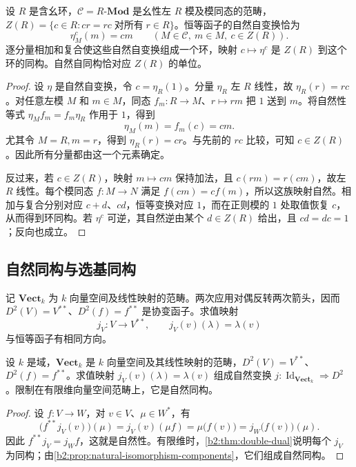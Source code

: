 \begin{proposition}\label{b2:prop:natural-center}
	设 \(R\) 是含幺环，\(\mathcal C=R\text{-}\mathbf{Mod}\) 是幺性左 \(R\) 模及模同态的范畴，\(Z(R)=\{c\in R:cr=rc\;\text{对所有}\;r\in R\}\)。恒等函子的自然自变换恰为
	\[
		\eta^c_M(m)=cm\qquad(M\in\mathcal C,\ m\in M,\ c\in Z(R)).
	\]
	逐分量相加和复合使这些自然自变换组成一个环，映射 \(c\mapsto\eta^c\) 是 \(Z(R)\) 到这个环的同构。自然自同构恰对应 \(Z(R)\) 的单位。
\end{proposition}
\begin{proof}
	设 \(\eta\) 是自然自变换，令 \(c=\eta_R(1)\)。分量 \(\eta_R\) 左 \(R\) 线性，故 \(\eta_R(r)=rc\)。对任意左模 \(M\) 和 \(m\in M\)，同态 \(f_m:R\to M\)、\(r\mapsto rm\) 把 \(1\) 送到 \(m\)。将自然性等式 \(\eta_M f_m=f_m\eta_R\) 作用于 \(1\)，得到
	\[
		\eta_M(m)=f_m(c)=cm.
	\]
	尤其令 \(M=R,m=r\)，得到 \(\eta_R(r)=cr\)。与先前的 \(rc\) 比较，可知 \(c\in Z(R)\)。因此所有分量都由这一个元素确定。

	反过来，若 \(c\in Z(R)\)，映射 \(m\mapsto cm\) 保持加法，且 \(c(rm)=r(cm)\)，故左 \(R\) 线性。每个模同态 \(f:M\to N\) 满足 \(f(cm)=cf(m)\)，所以这族映射自然。相加与复合分别对应 \(c+d\)、\(cd\)，恒等变换对应 \(1\)，而在正则模的 \(1\) 处取值恢复 \(c\)，从而得到环同构。若 \(\eta^c\) 可逆，其自然逆由某个 \(d\in Z(R)\) 给出，且 \(cd=dc=1\)；反向也成立。
\end{proof}

\subsection{自然同构与选基同构}
\label{b2:subsec:0502:02}

记 \(\mathbf{Vect}_k\) 为 \(k\) 向量空间及线性映射的范畴。两次应用对偶反转两次箭头，因而 \(D^2(V)=V^{**}\)、\(D^2(f)=f^{**}\) 是协变函子。求值映射
\[
	j_V:V\longrightarrow V^{**},\qquad j_V(v)(\lambda)=\lambda(v)
\]
与恒等函子有相同方向。

\begin{proposition}\label{b2:prop:natural-double-dual}
	设 \(k\) 是域，\(\mathbf{Vect}_k\) 是 \(k\) 向量空间及其线性映射的范畴，\(D^2(V)=V^{**}\)、\(D^2(f)=f^{**}\)。求值映射 \(j_V(v)(\lambda)=\lambda(v)\) 组成自然变换 \(j:\operatorname{Id}_{\mathbf{Vect}_k}\Rightarrow D^2\)。限制在有限维向量空间范畴上，它是自然同构。
\end{proposition}
\begin{proof}
	设 \(f:V\rightarrow W\)，对 \(v\in V\)、\(\mu\in W^*\)，有
	\[
		\bigl(f^{**}j_V(v)\bigr)(\mu) =j_V(v)(\mu f)=\mu\bigl(f(v)\bigr) =j_W\bigl(f(v)\bigr)(\mu).
	\]
	因此 \(f^{**}j_V=j_Wf\)，这就是自然性。有限维时，\cref{b2:thm:double-dual}说明每个 \(j_V\) 为同构；由\cref{b2:prop:natural-isomorphism-components}，它们组成自然同构。
\end{proof}

